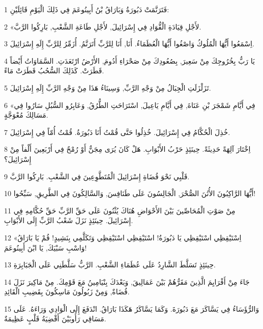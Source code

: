 \par 1 فَتَرَنَّمَتْ دَبُورَةُ وَبَارَاقُ بْنُ أَبِينُوعَمَ فِي ذَلِكَ الْيَوْمِ قَائِلَيْنِ:
\par 2 «لأَجْلِ قِيَادَةِ الْقُّوَادِ فِي إِسْرَائِيلَ, لأَجْلِ طَاعَةِ الشَّعْبِ, بَارِكُوا الرَّبَّ.
\par 3 اِسْمَعُوا أَيُّهَا الْمُلُوكُ وَاصْغُوا أَيُّهَا الْعُظَمَاءُ. أَنَا, أَنَا لِلرَّبِّ أَتَرَنَّمُ. أُزَمِّرُ لِلرَّبِّ إِلَهِ إِسْرَائِيلَ.
\par 4 يَا رَبُّ بِخُرُوجِكَ مِنْ سَعِيرَ, بِصُعُودِكَ مِنْ صَحْرَاءِ أَدُومَ, الأَرْضُ ارْتَعَدَتِ. السَّمَاوَاتُ أَيْضاً قَطَرَتْ. كَذَلِكَ السُّحُبُ قَطَرَتْ مَاءً.
\par 5 تَزَلْزَلَتِ الْجِبَالُ مِنْ وَجْهِ الرَّبِّ, وَسِينَاءُ هَذَا مِنْ وَجْهِ الرَّبِّ إِلَهِ إِسْرَائِيلَ.
\par 6 «فِي أَيَّامِ شَمْجَرَ بْنِ عَنَاةَ, فِي أَيَّامِ يَاعِيلَ, اسْتَرَاحَتِ الطُّرُقُ, وَعَابِرُو السُّبُلِ سَارُوا فِي مَسَالِكَ مُعْوَجَّةٍ.
\par 7 خُذِلَ الْحُكَّامُ فِي إِسْرَائِيلَ. خُذِلُوا حَتَّى قُمْتُ أَنَا دَبُورَةُ. قُمْتُ أُمّاً فِي إِسْرَائِيلَ.
\par 8 اِخْتَارَ آلِهَةً حَدِيثَةً. حِينَئِذٍ حَرْبُ الأَبْوَابِ. هَلْ كَانَ يُرَى مِجَنٌّ أَوْ رُمْحٌ فِي أَرْبَعِينَ أَلْفاً مِنْ إِسْرَائِيلَ؟
\par 9 قَلْبِي نَحْوَ قُضَاةِ إِسْرَائِيلَ الْمُتَطَّوِعِينَ فِي الشَّعْبِ. بَارِكُوا الرَّبَّ.
\par 10 أَيُّهَا الرَّاكِبُونَ الأُتُنَ الصُّحْرَ, الْجَالِسُونَ عَلَى طَنَافِسَ, وَالسَّالِكُونَ فِي الطَّرِيقِ, سَبِّحُوا!
\par 11 مِنْ صَوْتِ الْمُحَاصِّينَ بَيْنَ الأَحْوَاضِ هُنَاكَ يُثْنُونَ عَلَى حَقِّ الرَّبِّ حَقِّ حُكَّامِهِ فِي إِسْرَائِيلَ. حِينَئِذٍ نَزَلَ شَعْبُ الرَّبِّ إِلَى الأَبْوَابِ.
\par 12 «اِسْتَيْقِظِي اسْتَيْقِظِي يَا دَبُورَةُ! اسْتَيْقِظِي اسْتَيْقِظِي وَتَكَلَّمِي بِنَشِيدٍ! قُمْ يَا بَارَاقُ وَاسْبِ سَبْيَكَ, يَا ابْنَ أَبِينُوعَمَ!
\par 13 حِينَئِذٍ تَسَلَّطَ الشَّارِدُ عَلَى عُظَمَاءِ الشَّعْبِ. الرَّبُّ سَلَّطَنِي عَلَى الْجَبَابِرَةِ.
\par 14 جَاءَ مِنْ أَفْرَايِمَ الَّذِينَ مَقَرُّهُمْ بَيْنَ عَمَالِيقَ, وَبَعْدَكَ بِنْيَامِينُ مَعَ قَوْمِكَ. مِنْ مَاكِيرَ نَزَلَ قُضَاةٌ, وَمِنْ زَبُولُونَ مَاسِكُونَ بِقَضِيبِ الْقَائِدِ.
\par 15 وَالرُّؤَسَاءُ فِي يَسَّاكَرَ مَعَ دَبُورَةَ. وَكَمَا يَسَّاكَرُ هَكَذَا بَارَاقُ. انْدَفَعَ إِلَى الْوَادِي وَرَاءَهُ. عَلَى مَسَاقِي رَأُوبَيْنَ أَقْضِيَةُ قَلْبٍ عَظِيمَةٌ.
